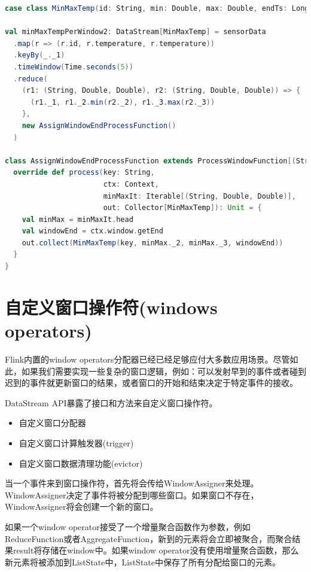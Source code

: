 \documentclass[oneside]{ctexbook}
\begin{document}
\begin{lstlisting}[language=scala]
case class MinMaxTemp(id: String, min: Double, max: Double, endTs: Long)

val minMaxTempPerWindow2: DataStream[MinMaxTemp] = sensorData
  .map(r => (r.id, r.temperature, r.temperature))
  .keyBy(_._1)
  .timeWindow(Time.seconds(5))
  .reduce(
    (r1: (String, Double, Double), r2: (String, Double, Double)) => {
      (r1._1, r1._2.min(r2._2), r1._3.max(r2._3))
    },
    new AssignWindowEndProcessFunction()
  )

class AssignWindowEndProcessFunction extends ProcessWindowFunction[(String, Double, Double), MinMaxTemp, String, TimeWindow] {
  override def process(key: String,
                       ctx: Context,
                       minMaxIt: Iterable[(String, Double, Double)],
                       out: Collector[MinMaxTemp]): Unit = {
    val minMax = minMaxIt.head
    val windowEnd = ctx.window.getEnd
    out.collect(MinMaxTemp(key, minMax._2, minMax._3, windowEnd))
  }
}
\end{lstlisting}

\section{自定义窗口操作符(windows operators)}

Flink内置的window operators分配器已经已经足够应付大多数应用场景。尽管如此，如果我们需要实现一些复杂的窗口逻辑，例如：可以发射早到的事件或者碰到迟到的事件就更新窗口的结果，或者窗口的开始和结束决定于特定事件的接收。

DataStream API暴露了接口和方法来自定义窗口操作符。

\begin{itemize}
  \item 自定义窗口分配器
  \item 自定义窗口计算触发器(trigger)
  \item 自定义窗口数据清理功能(evictor)
\end{itemize}

当一个事件来到窗口操作符，首先将会传给WindowAssigner来处理。WindowAssigner决定了事件将被分配到哪些窗口。如果窗口不存在，WindowAssigner将会创建一个新的窗口。

如果一个window operator接受了一个增量聚合函数作为参数，例如ReduceFunction或者AggregateFunction，新到的元素将会立即被聚合，而聚合结果result将存储在window中。如果window operator没有使用增量聚合函数，那么新元素将被添加到ListState中，ListState中保存了所有分配给窗口的元素。
\end{document}
